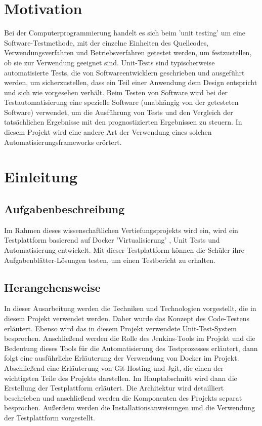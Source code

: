 \documentclass[a4paper,12pt,oneside]{book}
\begin{document}
	
\tableofcontents
\newpage
{}
\listoffigures
\newpage
{}
\lstlistoflistings
\newpage
\chapter{Motivation}
Bei der Computerprogrammierung handelt es sich beim 'unit testing' um eine Software-Testmethode, mit der einzelne Einheiten des Quellcodes,  Verwendungsverfahren und Betriebsverfahren getestet werden, um festzustellen, ob sie zur Verwendung geeignet sind.
\newline
Unit-Tests sind typischerweise automatisierte Tests, die von Softwareentwicklern geschrieben und ausgeführt werden, um sicherzustellen, dass ein Teil einer Anwendung dem Design entspricht und sich wie vorgesehen verhält.
\newline
Beim Testen von Software wird bei der Testautomatisierung eine spezielle Software (unabhängig von der getesteten Software) verwendet, um die Ausführung von Tests und den Vergleich der tatsächlichen Ergebnisse mit den prognostizierten Ergebnissen zu steuern.
\newline
In diesem Projekt wird eine andere Art der Verwendung eines solchen Automatisierungsframeworks erörtert.
\chapter{Einleitung}
\section{Aufgabenbeschreibung}

Im Rahmen dieses wissenschaftlichen Vertiefungsprojekts wird ein, wird ein Testplattform basierend auf Docker 'Virtualisierung' , Unit Tests und Automatisierung entwickelt.
\newline
Mit dieser Testplattform können die Schüler ihre Aufgabenblätter-Lösungen testen, um einen Testbericht zu erhalten.
\section{Herangehensweise}
In dieser Ausarbeitung werden die Techniken und Technologien vorgestellt, die in diesem Projekt verwendet werden. Daher wurde das Konzept des Code-Testens erläutert. Ebenso wird das in diesem Projekt verwendete Unit-Test-System besprochen. Anschließend werden die Rolle des Jenkins-Tools im Projekt und die Bedeutung dieses Tools für die Automatisierung des Testprozesses erläutert, dann folgt eine ausführliche Erläuterung der Verwendung von Docker im Projekt. Abschließend eine Erläuterung von Git-Hosting und Jgit, die einen der wichtigsten Teile des Projekts darstellen.
\newline
Im Hauptabschnitt wird dann die Erstellung der Testplattform erläutert. Die Architektur wird detailliert beschrieben und anschließend werden die Komponenten des Projekts separat besprochen. Außerdem werden die Installationsanweisungen und die Verwendung der Testplattform vorgestellt.
\end{document}
